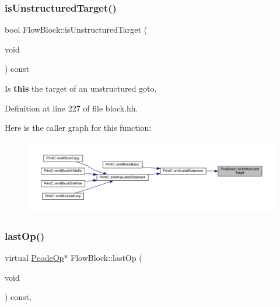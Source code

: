 \mbox{\label{class_flow_block_aa6033732e50b3e5476a86b8883a5483a}} 
\subsubsection{\texorpdfstring{isUnstructuredTarget()}{isUnstructuredTarget()}}
{\footnotesize\ttfamily bool Flow\+Block\+::is\+Unstructured\+Target (\begin{DoxyParamCaption}\item[{void}]{ }\end{DoxyParamCaption}) const\hspace{0.3cm}{\ttfamily [inline]}}



Is {\bfseries{this}} the target of an unstructured goto. 



Definition at line 227 of file block.\+hh.

Here is the caller graph for this function\+:
\nopagebreak
\begin{figure}[H]
\begin{center}
\leavevmode
\includegraphics[width=350pt]{class_flow_block_aa6033732e50b3e5476a86b8883a5483a_icgraph}
\end{center}
\end{figure}
\mbox{\label{class_flow_block_a5db2a7d4baa2070ebf3151b13fd16d09}} 
\subsubsection{\texorpdfstring{lastOp()}{lastOp()}}
{\footnotesize\ttfamily virtual \mbox{\hyperlink{class_pcode_op}{Pcode\+Op}}$\ast$ Flow\+Block\+::last\+Op (\begin{DoxyParamCaption}\item[{void}]{ }\end{DoxyParamCaption}) const\hspace{0.3cm}{\ttfamily [inline]}, {\ttfamily [virtual]}}



